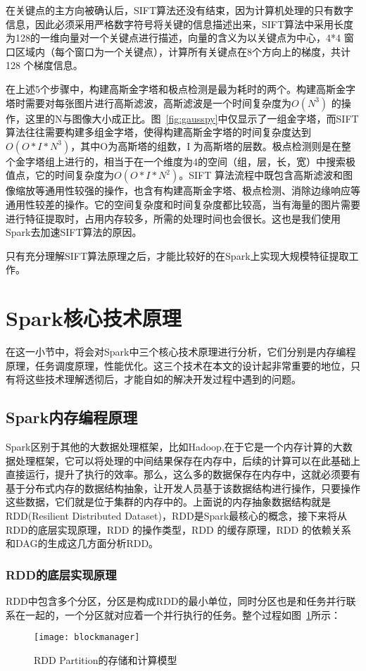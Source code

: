 在关键点的主方向被确认后，SIFT算法还没有结束，因为计算机处理的只有数字信息，因此必须采用严格数字符号将关键的信息描述出来，SIFT算法中采用长度为128的一维向量对一个关键点进行描述，向量的含义为以关键点为中心，4*4 窗口区域内（每个窗口为一个关键点），计算所有关键点在8个方向上的梯度，共计128 个梯度信息。

在上述5个步骤中，构建高斯金字塔和极点检测是最为耗时的两个。构建高斯金字塔时需要对每张图片进行高斯滤波，高斯滤波是一个时间复杂度为$O(N^3)$ 的操作，这里的N与图像大小成正比。图~\ref{fig:gausspy}中仅显示了一组金字塔，而SIFT算法往往需要构建多组金字塔，使得构建高斯金字塔的时间复杂度达到$O(O*I*N^3)$，其中O为高斯塔的组数，I 为高斯塔的层数。极点检测则是在整个金字塔组上进行的，相当于在一个维度为4的空间（组，层，长，宽）中搜索极值点，它的时间复杂度为$O(O*I*N^2)$。SIFT 算法流程中既包含高斯滤波和图像缩放等通用性较强的操作，也含有构建高斯金字塔、极点检测、消除边缘响应等通用性较差的操作。它的空间复杂度和时间复杂度都比较高，当有海量的图片需要进行特征提取时，占用内存较多，所需的处理时间也会很长。这也是我们使用Spark去加速SIFT算法的原因。

只有充分理解SIFT算法原理之后，才能比较好的在Spark上实现大规模特征提取工作。

\section{Spark核心技术原理}
在这一小节中，将会对Spark中三个核心技术原理进行分析，它们分别是内存编程原理，任务调度原理，性能优化。这三个技术在本文的设计起非常重要的地位，只有将这些技术理解透彻后，才能自如的解决开发过程中遇到的问题。
\subsection{Spark内存编程原理}
Spark区别于其他的大数据处理框架，比如Hadoop,在于它是一个内存计算的大数据处理框架，它可以将处理的中间结果保存在内存中，后续的计算可以在此基础上直接运行，提升了执行的效率。那么，这么多的数据保存在内存中，这就必须要有基于分布式内存的数据结构抽象，让开发人员基于该数据结构进行操作，只要操作这些数据，它们就是位于集群的内存中的。上面说的内存抽象数据结构就是RDD(Resilient Distributed Dataset)，RDD是Spark最核心的概念，接下来将从RDD的底层实现原理，RDD 的操作类型，RDD 的缓存原理，RDD 的依赖关系和DAG的生成这几方面分析RDD。
\subsubsection{RDD的底层实现原理}
RDD中包含多个分区，分区是构成RDD的最小单位，同时分区也是和任务并行联系在一起的，一个分区就对应着一个并行执行的任务。整个过程如图~\ref{fig:blockmanager}所示：
\begin{figure}[htp]
\centering
\texttt{[image: blockmanager]}
\caption{RDD Partition的存储和计算模型}
\label{fig:blockmanager}
\end{figure}

